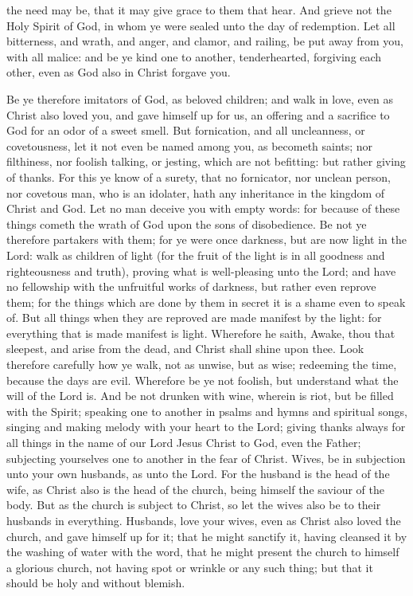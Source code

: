 the need may be, that it may give grace to them that hear. And grieve not the Holy Spirit of God, in whom ye were sealed unto the day of redemption. Let all bitterness, and wrath, and anger, and clamor, and railing, be put away from you, with all malice: and be ye kind one to another, tenderhearted, forgiving each other, even as God also in Christ forgave you. 

Be ye therefore imitators of God, as beloved children; and walk in love, even as Christ also loved you, and gave himself up for us, an offering and a sacrifice to God for an odor of a sweet smell.  But fornication, and all uncleanness, or covetousness, let it not even be named among you, as becometh saints; nor filthiness, nor foolish talking, or jesting, which are not befitting: but rather giving of thanks. For this ye know of a surety, that no fornicator, nor unclean person, nor covetous man, who is an idolater, hath any inheritance in the kingdom of Christ and God. Let no man deceive you with empty words: for because of these things cometh the wrath of God upon the sons of disobedience. Be not ye therefore partakers with them; for ye were once darkness, but are now light in the Lord: walk as children of light (for the fruit of the light is in all goodness and righteousness and truth), proving what is well-pleasing unto the Lord; and have no fellowship with the unfruitful works of darkness, but rather even reprove them; for the things which are done by them in secret it is a shame even to speak of. But all things when they are reproved are made manifest by the light: for everything that is made manifest is light. Wherefore he saith, Awake, thou that sleepest, and arise from the dead, and Christ shall shine upon thee.  Look therefore carefully how ye walk, not as unwise, but as wise; redeeming the time, because the days are evil. Wherefore be ye not foolish, but understand what the will of the Lord is. And be not drunken with wine, wherein is riot, but be filled with the Spirit; speaking one to another in psalms and hymns and spiritual songs, singing and making melody with your heart to the Lord; giving thanks always for all things in the name of our Lord Jesus Christ to God, even the Father; subjecting yourselves one to another in the fear of Christ.  Wives, be in subjection unto your own husbands, as unto the Lord. For the husband is the head of the wife, as Christ also is the head of the church, being himself the saviour of the body. But as the church is subject to Christ, so let the wives also be to their husbands in everything. Husbands, love your wives, even as Christ also loved the church, and gave himself up for it; that he might sanctify it, having cleansed it by the washing of water with the word, that he might present the church to himself a glorious church, not having spot or wrinkle or any such thing; but that it should be holy and without blemish. 